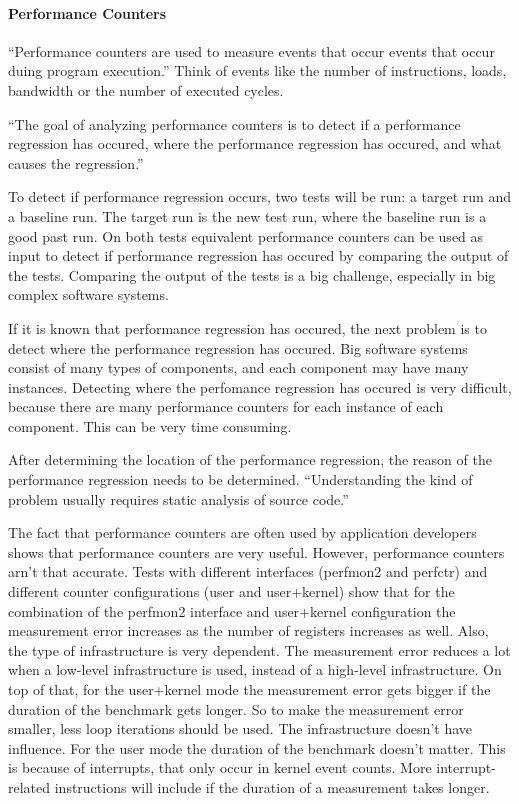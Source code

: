 \paragraph{Performance Counters}``Performance counters are used to measure events that occur events that occur duing program execution.''\cite{PC} Think of events like the number of instructions, loads, bandwidth or the number of executed cycles.

``The goal of analyzing performance counters is to detect if a performance regression has occured, where the performance regression has occured, and what causes the regression.'' \cite{nguyen2012using}

To detect if performance regression occurs, two tests will be run: a target run and a baseline run. The target run is the new test run, where the baseline run is a good past run. On both tests equivalent performance counters can be used as input to detect if performance regression has occured by comparing the output of the tests. Comparing the output of the tests is a big challenge, especially in big complex software systems.

If it is known that performance regression has occured, the next problem is to detect where the performance regression has occured. Big software systems consist of many types of components, and each component may have many instances. Detecting where the perfomance regression has occured is very difficult, because there are many performance counters for each instance of each component. This can be very time consuming.

After determining the location of the performance regression, the reason of the performance regression needs to be determined. ``Understanding the kind of problem usually requires static analysis of source code.'' \cite{nguyen2012using}

The fact that performance counters are often used by application developers shows that performance counters are very useful. However, performance counters arn't that accurate. Tests with different interfaces (perfmon2 and perfctr) and different counter configurations (user and user+kernel) show that for the combination of the perfmon2 interface and user+kernel configuration the measurement error increases as the number of registers increases as well. \cite{AccuracyPerformanceCounter}
Also, the type of infrastructure is very dependent. The measurement error reduces a lot when a low-level infrastructure is used, instead of a high-level infrastructure.
On top of that, for the user+kernel mode the measurement error gets bigger if the duration of the benchmark gets longer. \cite{AccuracyPerformanceCounter} So to make the measurement error smaller, less loop iterations should be used.  The infrastructure doesn't have influence. For the user mode the duration of the benchmark doesn't matter. This is because of interrupts, that only occur in kernel event counts. More interrupt-related instructions will include if the duration of a measurement takes longer.
